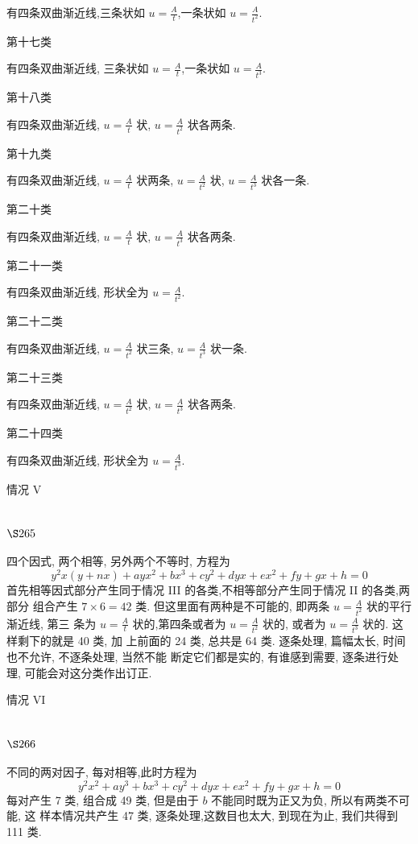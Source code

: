 有四条双曲渐近线,三条状如 $u=\frac{A}{t}$,一条状如 $u=\frac{A}{t^{2}}$.

第十七类

有四条双曲渐近线, 三条状如 $u=\frac{A}{t}$,一条状如 $u=\frac{A}{t^{3}}$.

第十八类

有四条双曲渐近线, $u=\frac{A}{t}$ 状, $u=\frac{A}{t^{2}}$ 状各两条.

第十九类

有四条双曲渐近线, $u=\frac{A}{t}$ 状两条, $u=\frac{A}{t^{2}}$ 状, $u=\frac{A}{t^{3}}$ 状各一条.

第二十类

有四条双曲渐近线, $u=\frac{A}{t}$ 状, $u=\frac{A}{t^{3}}$ 状各两条.

第二十一类

有四条双曲渐近线, 形状全为 $u=\frac{A}{t^{2}}$.

第二十二类

有四条双曲渐近线, $u=\frac{A}{t^{2}}$ 状三条, $u=\frac{A}{t^{3}}$ 状一条.

第二十三类

有四条双曲渐近线, $u=\frac{A}{t^{2}}$ 状, $u=\frac{A}{t^{3}}$ 状各两条.

第二十四类

有四条双曲渐近线, 形状全为 $u=\frac{A}{t^{3}}$.

情况 V

\section{$\S 265$}

四个因式, 两个相等, 另外两个不等时, 方程为
\[
y^{2} x(y+n x)+a y x^{2}+b x^{3}+c y^{2}+d y x+e x^{2}+f y+g x+h=0
\]
首先相等因式部分产生同于情况 III 的各类,不相等部分产生同于情况 II 的各类,两部分 组合产生 $7 \times 6=42$ 类. 但这里面有两种是不可能的, 即两条 $u=\frac{A}{t^{2}}$ 状的平行渐近线, 第三 条为 $u=\frac{A}{t}$ 状的,第四条或者为 $u=\frac{A}{t^{2}}$ 状的, 或者为 $u=\frac{A}{t^{3}}$ 状的. 这样剩下的就是 40 类, 加 上前面的 24 类, 总共是 64 类. 逐条处理, 篇幅太长, 时间也不允许, 不逐条处理, 当然不能 断定它们都是实的, 有谁感到需要, 逐条进行处理, 可能会对这分类作出订正.

情况 VI

\section{$\S 266$}

不同的两对因子, 每对相等,此时方程为
\[
y^{2} x^{2}+a y^{3}+b x^{3}+c y^{2}+d y x+e x^{2}+f y+g x+h=0
\]
每对产生 7 类, 组合成 49 类, 但是由于 $b$ 不能同时既为正又为负, 所以有两类不可能, 这 样本情况共产生 47 类, 逐条处理,这数目也太大, 到现在为止, 我们共得到 111 类.


